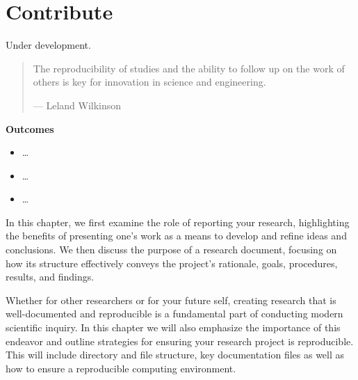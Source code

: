 \documentclass[
  letterpaper,
  DIV=11,
  numbers=noendperiod]{scrreprt}
\providecommand{\tightlist}{%
  \setlength{\itemsep}{0pt}\setlength{\parskip}{0pt}}\usepackage{longtable,booktabs,array}
\theoremstyle{definition}
\theoremstyle{remark}
\begin{document}
\chapter{Contribute}\label{sec-contributing}

\begin{tcolorbox}[enhanced jigsaw, bottomrule=.15mm, colframe=quarto-callout-caution-color-frame, opacitybacktitle=0.6, bottomtitle=1mm, arc=.35mm, colbacktitle=quarto-callout-caution-color!10!white, coltitle=black, toprule=.15mm, leftrule=.75mm, title=\textcolor{quarto-callout-caution-color}{\faFire}\hspace{0.5em}{Caution}, colback=white, opacityback=0, breakable, toptitle=1mm, titlerule=0mm, rightrule=.15mm, left=2mm]

Under development.

\end{tcolorbox}

\begin{quote}
The reproducibility of studies and the ability to follow up on the work
of others is key for innovation in science and engineering.

--- Leland Wilkinson
\end{quote}

\begin{tcolorbox}[enhanced jigsaw, leftrule=.75mm, colframe=quarto-callout-color-frame, colback=white, rightrule=.15mm, opacityback=0, arc=.35mm, breakable, bottomrule=.15mm, left=2mm, toprule=.15mm]

\textbf{ Outcomes}

\begin{itemize}
\tightlist
\item
  \ldots{}
\item
  \ldots{}
\item
  \ldots{}
\end{itemize}

\end{tcolorbox}

In this chapter, we first examine the role of reporting your research,
highlighting the benefits of presenting one's work as a means to develop
and refine ideas and conclusions. We then discuss the purpose of a
research document, focusing on how its structure effectively conveys the
project's rationale, goals, procedures, results, and findings.

Whether for other researchers or for your future self, creating research
that is well-documented and reproducible is a fundamental part of
conducting modern scientific inquiry. In this chapter we will also
emphasize the importance of this endeavor and outline strategies for
ensuring your research project is reproducible. This will include
directory and file structure, key documentation files as well as how to
ensure a reproducible computing environment.
\end{document}
